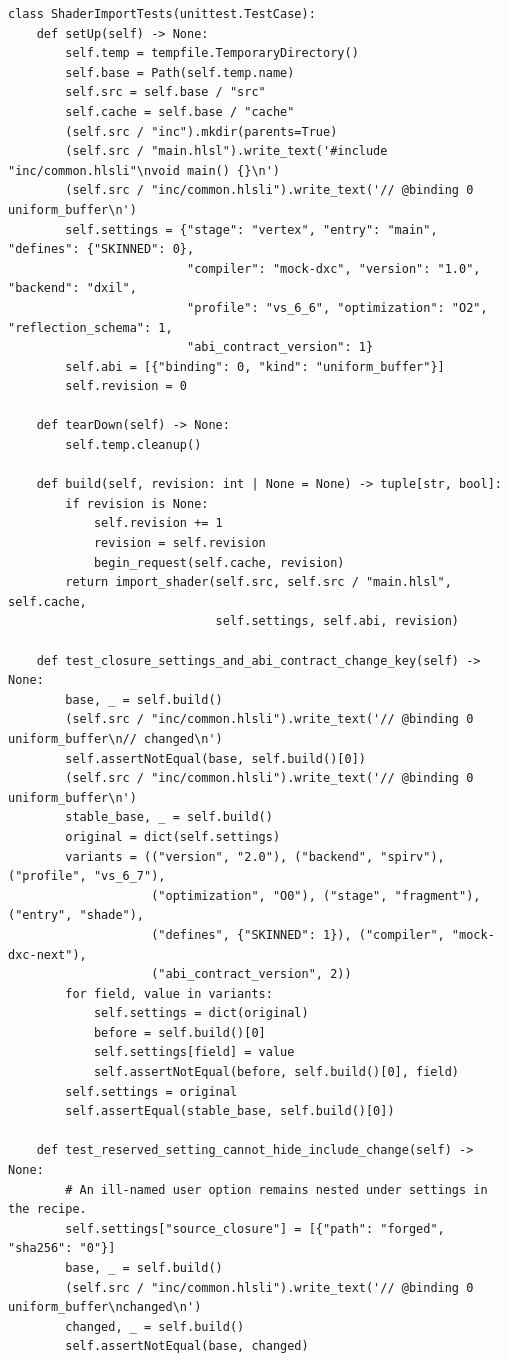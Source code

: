 \begin{verbatim}
class ShaderImportTests(unittest.TestCase):
    def setUp(self) -> None:
        self.temp = tempfile.TemporaryDirectory()
        self.base = Path(self.temp.name)
        self.src = self.base / "src"
        self.cache = self.base / "cache"
        (self.src / "inc").mkdir(parents=True)
        (self.src / "main.hlsl").write_text('#include "inc/common.hlsli"\nvoid main() {}\n')
        (self.src / "inc/common.hlsli").write_text('// @binding 0 uniform_buffer\n')
        self.settings = {"stage": "vertex", "entry": "main", "defines": {"SKINNED": 0},
                         "compiler": "mock-dxc", "version": "1.0", "backend": "dxil",
                         "profile": "vs_6_6", "optimization": "O2", "reflection_schema": 1,
                         "abi_contract_version": 1}
        self.abi = [{"binding": 0, "kind": "uniform_buffer"}]
        self.revision = 0

    def tearDown(self) -> None:
        self.temp.cleanup()

    def build(self, revision: int | None = None) -> tuple[str, bool]:
        if revision is None:
            self.revision += 1
            revision = self.revision
            begin_request(self.cache, revision)
        return import_shader(self.src, self.src / "main.hlsl", self.cache,
                             self.settings, self.abi, revision)

    def test_closure_settings_and_abi_contract_change_key(self) -> None:
        base, _ = self.build()
        (self.src / "inc/common.hlsli").write_text('// @binding 0 uniform_buffer\n// changed\n')
        self.assertNotEqual(base, self.build()[0])
        (self.src / "inc/common.hlsli").write_text('// @binding 0 uniform_buffer\n')
        stable_base, _ = self.build()
        original = dict(self.settings)
        variants = (("version", "2.0"), ("backend", "spirv"), ("profile", "vs_6_7"),
                    ("optimization", "O0"), ("stage", "fragment"), ("entry", "shade"),
                    ("defines", {"SKINNED": 1}), ("compiler", "mock-dxc-next"),
                    ("abi_contract_version", 2))
        for field, value in variants:
            self.settings = dict(original)
            before = self.build()[0]
            self.settings[field] = value
            self.assertNotEqual(before, self.build()[0], field)
        self.settings = original
        self.assertEqual(stable_base, self.build()[0])

    def test_reserved_setting_cannot_hide_include_change(self) -> None:
        # An ill-named user option remains nested under settings in the recipe.
        self.settings["source_closure"] = [{"path": "forged", "sha256": "0"}]
        base, _ = self.build()
        (self.src / "inc/common.hlsli").write_text('// @binding 0 uniform_buffer\nchanged\n')
        changed, _ = self.build()
        self.assertNotEqual(base, changed)


\end{verbatim}
